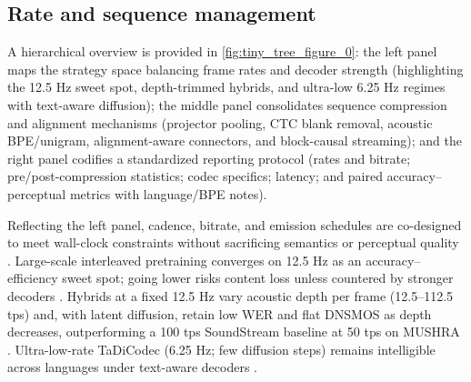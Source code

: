 \documentclass{article}
\begin{document}
\subsection{Rate and sequence management} \label{subsec:Rate and sequence management}
A hierarchical overview is provided in \autoref{fig:tiny_tree_figure_0}: the left panel maps the strategy space balancing frame rates and decoder strength (highlighting the 12.5 Hz sweet spot, depth-trimmed hybrids, and ultra-low 6.25 Hz regimes with text-aware diffusion); the middle panel consolidates sequence compression and alignment mechanisms (projector pooling, CTC blank removal, acoustic BPE/unigram, alignment-aware connectors, and block-causal streaming); and the right panel codifies a standardized reporting protocol (rates and bitrate; pre/post-compression statistics; codec specifics; latency; and paired accuracy--perceptual metrics with language/BPE notes).

Reflecting the left panel, cadence, bitrate, and emission schedules are co-designed to meet wall-clock constraints without sacrificing semantics or perceptual quality \cite{zhao2024textlessstreamingspeechtranslationsemant,liu2024analyzingmitigatinginconsistencydiscrete,zhang2025impactframeratesspeechtokenizercasestudy,huang2024repcodecspeechrepresentationcodectokeniz}. Large-scale interleaved pretraining converges on 12.5 Hz as an accuracy--efficiency sweet spot; going lower risks content loss unless countered by stronger decoders \cite{zeng2024scalingspeechtextpretrainingsyntheticint}. Hybrids at a fixed 12.5 Hz vary acoustic depth per frame (12.5--112.5 tps) and, with latent diffusion, retain low WER and flat DNSMOS as depth decreases, outperforming a 100 tps SoundStream baseline at 50 tps on MUSHRA \cite{yang2025diffsoundstreamefficientspeechtokenizati}. Ultra-low-rate TaDiCodec (6.25 Hz; few diffusion steps) remains intelligible across languages under text-aware decoders \cite{wang2025tadicodectextawarediffusionspeechtokeniz}.
\end{document}
